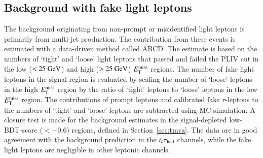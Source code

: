 \subsection{Background with fake light leptons}
The background originating from non-prompt or misidentified light leptons is primarily from multi-jet production.
The contribution from these events is estimated with a data-driven method called ABCD.
The estimate is based on the numbers of `tight' and `loose' light leptons that passed and failed the PLIV cut in the low ($<25~\text{GeV}$) and high
($>25~\text{GeV}$) $E_{\text{T}}^{\text{miss}}$ regions. The number of
fake light leptons in the signal region is evaluated by scaling the number of `loose' leptons in the high $E_{\text{T}}^{\text{miss}}$ region by the ratio of `tight' leptons to `loose' leptons in the
low $E_{\text{T}}^{\text{miss}}$ region. The contributions of prompt leptons and calibrated fake $\tau$-leptons to the numbers of `tight' and `loose' leptons are subtracted using MC simulation.
A closure test is made for the background estimates in the signal-depleted low-BDT-score ($<-0.6$) regions, defined in Section~\ref{sec:tmva}.
The data are in good agreement with the background prediction in the
$t_{\ell}\tau_{\mathrm{had}}$ channels, while the fake light leptons are negligible in other leptonic channels. 
